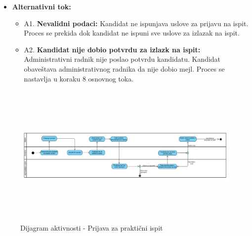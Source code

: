 \begin{itemize}
\item \textbf{Alternativni tok:}  
   \begin{itemize}
   \item A1. \textbf{Nevalidni podaci:}
  Kandidat ne ispunjava uslove za prijavu na ispit. Proces se prekida dok kandidat ne ispuni sve uslove za izlazak na ispit.
  \item A2. \textbf{Kandidat nije dobio potvrdu za izlazk na ispit:}
  Administrativni radnik nije poslao potvrdu kandidatu. Kandidat obaveštava administrativnog radnika da nije dobio mejl. Proces se nastavlja u koraku 8 osnovnog toka.
   \end{itemize}

\end{itemize}  

\begin{figure}[H]
  \begin{center}
      \includegraphics[width=140mm, height=70mm]{Diagrams/dijagram_aktivnosti_prijava_za_praktican_ispit.png}
  \end{center}
  \caption {Dijagram aktivnosti - Prijava za praktični ispit}
  \label{activity_prijava_za_prakticni_ispit}

\end{figure}

